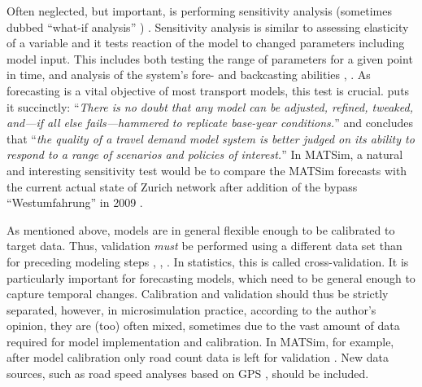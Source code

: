Often neglected, but important, is performing sensitivity analysis (sometimes dubbed ``what-if analysis'' \citep[][p.155]{Kleijnen_EJOR_1995}) \citep[][]{KurthEtAl_TRBTDF_2006, CambridgeSystematics_manual_2008, CFD_TRB_2007}. Sensitivity analysis is similar to assessing elasticity of a variable \citep[][p.3f]{WegmannEverett_TechRep_CTRUT_2008} and it tests reaction of the model to changed parameters including model input. This includes both testing the range of parameters for a given point in time, and analysis of the system's fore- and backcasting abilities \citep[e.g.,][p.56]{CFD_TRB_2007}, \citep[][]{CambridgeSystematics_manual_2008}. As forecasting is a vital objective of most transport models, this test is crucial. \citet[][p.158]{PendyalaBhat_TRBTDF_2006} puts it succinctly: ``\emph{There is no doubt that any model can be adjusted, refined, tweaked, and---if all else fails---hammered to replicate base-year conditions.}'' and concludes that ``\emph{the quality of a travel demand model system is better judged on its ability to respond to a range of scenarios and policies of interest.}'' In MATSim, a natural and interesting sensitivity test would be to compare the MATSim forecasts with the current actual state of Zurich network after addition of the bypass ``Westumfahrung'' in 2009 \citep[][]{BalmerEtAl_ResRep_bdktzrh_2009, Westumfahrung_Webpage_2008}.

As mentioned above, models are in general flexible enough to be calibrated to target data. Thus, validation \emph{must} be performed using a different data set than for preceding modeling steps \citep[][p.1]{CambridgeSystematics_manual_2008}, \citep[][p.56]{CFD_TRB_2007}, \citep[][p.18]{OrtuzarWillumsen_2001}. In statistics, this is called cross-validation. It is particularly important for forecasting models, which need to be general enough to capture temporal changes. Calibration and validation should thus be strictly separated, however, in microsimulation practice, according to the author's opinion, they are (too) often mixed, sometimes due to the vast amount of data required for model implementation and calibration. In MATSim, for example, after model calibration only road count data is left for validation \citep[][]{HorniEtAl_STRC_2009}. New data sources, such as road speed analyses based on GPS \citep[][]{HackneyEtAl_JGS_2007}, should be included.

